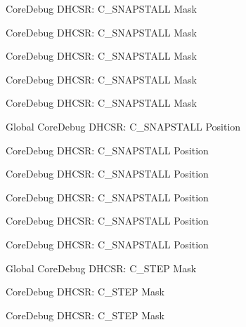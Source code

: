 \begin{DoxyRefList}
\label{deprecated__deprecated000483}%
%
Core\+Debug DHCSR\+: C\+\_\+\+SNAPSTALL Mask 

\label{deprecated__deprecated000394}%
%
Core\+Debug DHCSR\+: C\+\_\+\+SNAPSTALL Mask 

\label{deprecated__deprecated000176}%
%
Core\+Debug DHCSR\+: C\+\_\+\+SNAPSTALL Mask 

\label{deprecated__deprecated000318}%
%
Core\+Debug DHCSR\+: C\+\_\+\+SNAPSTALL Mask 

\label{deprecated__deprecated000585}%
%
Core\+Debug DHCSR\+: C\+\_\+\+SNAPSTALL Mask  
\item[Global \doxylink{group___c_m_s_i_s___core_debug_ga85747214e2656df6b05ec72e4d22bd6d}{Core\+Debug\+\_\+\+DHCSR\+\_\+\+C\+\_\+\+SNAPSTALL\+\_\+\+Pos} ]\label{deprecated__deprecated000393}%
%
Core\+Debug DHCSR\+: C\+\_\+\+SNAPSTALL Position 

\label{deprecated__deprecated000031}%
%
Core\+Debug DHCSR\+: C\+\_\+\+SNAPSTALL Position 

\label{deprecated__deprecated000584}%
%
Core\+Debug DHCSR\+: C\+\_\+\+SNAPSTALL Position 

\label{deprecated__deprecated000175}%
%
Core\+Debug DHCSR\+: C\+\_\+\+SNAPSTALL Position 

\label{deprecated__deprecated000482}%
%
Core\+Debug DHCSR\+: C\+\_\+\+SNAPSTALL Position 

\label{deprecated__deprecated000317}%
%
Core\+Debug DHCSR\+: C\+\_\+\+SNAPSTALL Position  
\item[Global \doxylink{group___c_m_s_i_s___core_debug_gae6bda72fbd32cc5734ff3542170dc00d}{Core\+Debug\+\_\+\+DHCSR\+\_\+\+C\+\_\+\+STEP\+\_\+\+Msk} ]\label{deprecated__deprecated000036}%
%
Core\+Debug DHCSR\+: C\+\_\+\+STEP Mask 

\label{deprecated__deprecated000322}%
%
Core\+Debug DHCSR\+: C\+\_\+\+STEP Mask 

\label{deprecated__deprecated000398}%
%
Core\+Debug DHCSR\+: C\+\_\+\+STEP Mask 


\end{DoxyRefList}
